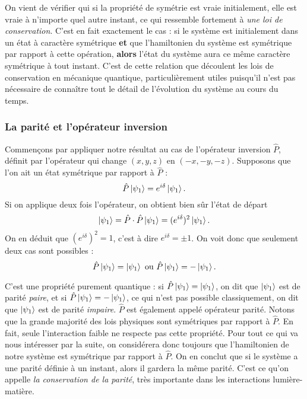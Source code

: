 On vient de vérifier qui si la propriété de symétrie est vraie initialement, elle est vraie à n'importe quel autre instant, ce qui ressemble fortement à \textit{une loi de conservation}. C'est en fait exactement le cas : si le système est initialement dans un état à caractère symétrique \textbf{et} que l'hamiltonien du système est symétrique par rapport à cette opération, \textbf{alors} l'état du système aura ce même caractère symétrique à tout instant. C'est de cette relation que découlent les lois de conservation en mécanique quantique, particulièrement utiles puisqu'il n'est pas nécessaire de connaître tout le détail de l'évolution du système au cours du temps.

\subsubsection{La parité et l'opérateur inversion}
Commençons par appliquer notre résultat au cas de l'opérateur inversion $\hat{P}$, définit par l'opérateur qui change $(x,y,z)$ en $(-x,-y,-z)$. Supposons que l'on ait un état symétrique par rapport à $\hat{P}$ : 
\begin{equation*}
\hat{P}\ket{\psi_1} = e^{i\delta}\ket{\psi_1}.
\end{equation*}
Si on applique deux fois l'opérateur, on obtient bien sûr l'état de départ
\begin{equation*}
\ket{\psi_1} = \hat{P}\cdot\hat{P}\ket{\psi_1} = (e^{i\delta})^2\ket{\psi_1}.
\end{equation*}
On en déduit que $(e^{i\delta})^2=1$, c'est à dire $e^{i\delta}=\pm1$. On voit donc que seulement deux cas sont possibles :
\begin{equation*}
\hat{P}\ket{\psi_1} = \ket{\psi_1} \mbox{ ou } \hat{P}\ket{\psi_1} = -\ket{\psi_1}.
\end{equation*}

C'est une propriété purement quantique : si $\hat{P}\ket{\psi_1}= \ket{\psi_1}$, on dit que $\ket{\psi_1}$ est de parité \textit{paire}, et si $\hat{P}\ket{\psi_1}= -\ket{\psi_1}$, ce qui n'est pas possible classiquement, on dit que $\ket{\psi_1}$ est de parité \textit{impaire}. $\hat{P}$ est également appelé opérateur parité. Notons que la grande majorité des lois physiques sont symétriques par rapport à $\hat{P}$. En fait, seule l'interaction faible ne respecte pas cette propriété. Pour tout ce qui va nous intéresser par la suite, on considérera donc toujours que l'hamiltonien de notre système est symétrique par rapport à $\hat{P}$. On en conclut que si le système a une parité définie à un instant, alors il gardera la même parité. C'est ce qu'on appelle \textit{la conservation de la parité}, très importante dans les interactions lumière-matière.

